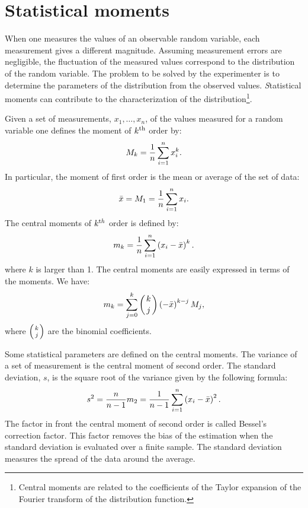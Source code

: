 \section{Statistical moments}
\label{sec:moments} When one measures the values of an observable
random variable, each measurement gives a different magnitude.
Assuming measurement errors are negligible, the fluctuation of the
measured values correspond to the distribution of the random
variable. The problem to be solved by the experimenter is to
determine the parameters of the distribution from the observed
values. {\textsl Statistical moments} can contribute to the
characterization of the distribution\footnote{Central moments are
related to the coefficients of the Taylor expansion of the Fourier
transform of the distribution function.}.

Given a set of measurements, $x_1,\ldots,x_n$, of the values
measured for a random variable one defines the moment of $k^{\mathop{\textrm{th}}}$
order by:
\begin{equation}
  M_k={1\over n}\sum_{i=1}^n x_i^k.
\end{equation}
In particular, the moment of first order is the mean or average of
the set of data:
\begin{equation}
\label{eq:average}
  \bar{x}=M_1={1\over n}\sum_{i=1}^n x_i.
\end{equation}
The central moments of $k^{\mathop{\textrm th}}$ order is defined by:
\begin{equation}
  m_k={1\over n}\sum_{i=1}^n \left(x_i-\bar{x}\right)^k.
\end{equation}
where $k$ is larger than 1. The central moments are easily
expressed in terms of the moments. We have:
\begin{equation}
  m_k=\sum_{j=0}^k \left({k \atop j}\right)\left(-\bar{x}\right)^{k-j}M_j,
\end{equation}
where $\left({k \atop j}\right)$ are the binomial coefficients.

Some statistical parameters are defined on the central moments.
The variance of a set of measurement is the central moment of
second order. The standard deviation, $s$, is the square root of
the variance given by the following formula:
\begin{equation}
s^2={\displaystyle n \over \displaystyle n-1}m_2 ={\displaystyle 1
\over \displaystyle n-1} \sum_{i=1}^n \left(x_i-\bar{x}\right)^2.
\end{equation}
The factor in front the central moment of second order is called
Bessel's correction factor. This factor removes the bias of the
estimation when the standard deviation is evaluated over a finite
sample. The standard deviation measures the spread of the data
around the average.

